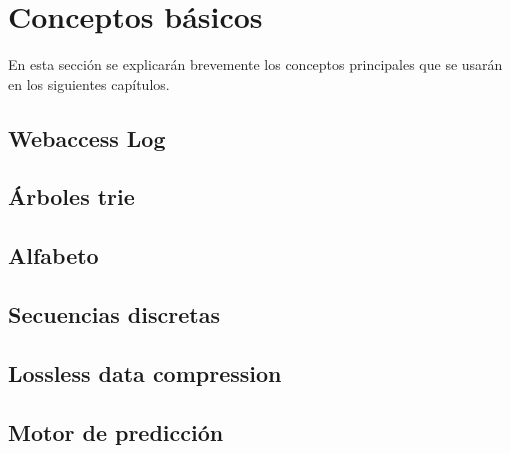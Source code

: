 \section[Conceptos básicos]{Conceptos básicos} \label{conceptos-basicos}


En esta sección se explicarán brevemente los conceptos principales que se usarán en los siguientes capítulos.




\subsection{Webaccess Log}\label{concept-accesslog}


\subsection{Árboles trie} \label{concept-trie}



\subsection{Alfabeto} \label{concept-alphabet}


\subsection{Secuencias discretas}\label{concept-discret-seq}



\subsection{Lossless data compression} \label{concept-LDC}



\subsection{Motor de predicción}\label{concept-enginepredict}

